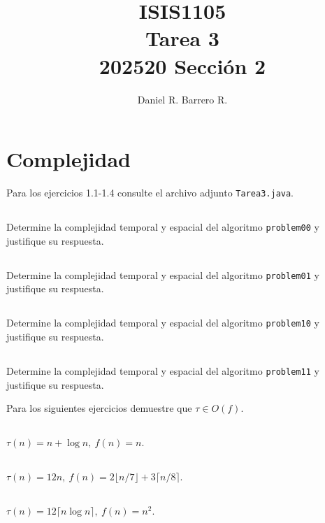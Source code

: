 \documentclass{amsart}
\title{ISIS1105\\ Tarea 3\\ 202520 Sección 2}
\author{Daniel R. Barrero R.}
\begin{document}
\maketitle

%

\section{Complejidad} Para los ejercicios 1.1-1.4 consulte el archivo adjunto 
\texttt{Tarea3.java}.

\subsection{} Determine la complejidad temporal y espacial del algoritmo
\texttt{problem00} y justifique su respuesta.

\subsection{} Determine la complejidad temporal y espacial del algoritmo
\texttt{problem01} y justifique su respuesta.

\subsection{} Determine la complejidad temporal y espacial del algoritmo
\texttt{problem10} y justifique su respuesta.

\subsection{} Determine la complejidad temporal y espacial del algoritmo
\texttt{problem11} y justifique su respuesta.

\bigskip
Para los siguientes ejercicios demuestre que $\tau \in O(f)$.

\subsection{} \(\tau(n)= n + \log n,\ f(n)= n\).

\subsection{} \(\tau(n)= 12n,\ f(n)= 2\lfloor n/7 \rfloor + 3\lceil n/8 \rceil\).

\subsection{} \(\tau(n)= 12\lceil n\log n \rceil,\ f(n)= n^2\).
\end{document}
